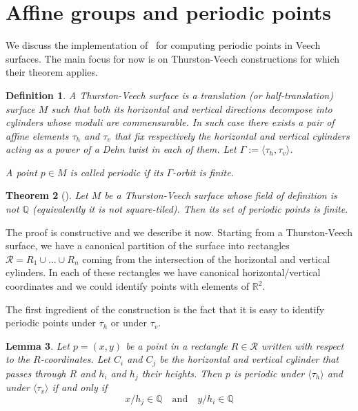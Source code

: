 \documentclass[a4paper,12pt]{article}
\def\bR{\mathbb{R}}
\def\bQ{\mathbb{Q}}
\newtheorem{definition}{Definition}
\newtheorem{lemma}[definition]{Lemma}
\newtheorem{theorem}[definition]{Theorem}
\begin{document}
\section{Affine groups and periodic points}
We discuss the implementation of~\cite{ChowdhuryEverettFreedmanLee} for computing
periodic points in Veech surfaces. The main focus for now is on Thurston-Veech
constructions for which their theorem applies.

\begin{definition}
A \emph{Thurston-Veech surface} is a translation (or half-translation) surface $M$ such
that both its horizontal and vertical directions decompose into cylinders
whose moduli are commensurable. In such case there exists a pair of affine
elements $\tau_h$ and $\tau_v$ that fix respectively the horizontal and
vertical cylinders acting as a power of a Dehn twist in each of them.
Let $\Gamma := \langle \tau_h, \tau_v \rangle$.

A point $p \in M$ is called \emph{periodic} if its $\Gamma$-orbit is finite.
\end{definition}

\begin{theorem}[\cite{ChowdhuryEverettFreedmanLee}]
Let $M$ be a Thurston-Veech surface whose field of definition is not $\bQ$
(equivalently it is not square-tiled). Then its set of periodic points
is finite.
\end{theorem}

The proof is constructive and we describe it now.
Starting from a Thurston-Veech surface, we have a canonical partition of the
surface into rectangles $\mathcal{R} = R_1 \cup \ldots \cup R_n$ coming
from the intersection of the horizontal and vertical cylinders. In each
of these rectangles we have canonical horizontal/vertical coordinates and we could
identify points with elements of $\bR^2$. 

The first ingredient of the construction is the fact that it is easy to identify
periodic points under $\tau_h$ or under $\tau_v$.
\begin{lemma}
Let $p=(x,y)$ be a point in a rectangle $R \in \mathcal{R}$ written with
respect to the $R$-coordinates. Let $C_i$ and $C_j$ be the horizontal
and vertical cylinder that passes through $R$ and $h_i$ and $h_j$
their heights. Then $p$ is periodic under $\langle \tau_h \rangle$ and
under $\langle \tau_v \rangle$ if and only if 
\begin{equation}
\label{eq:tauh:tauv:periodicity}
x / h_j \in \bQ
\quad \text{and} \quad
y / h_i \in \bQ
\end{equation}
\end{lemma}
\end{document}
